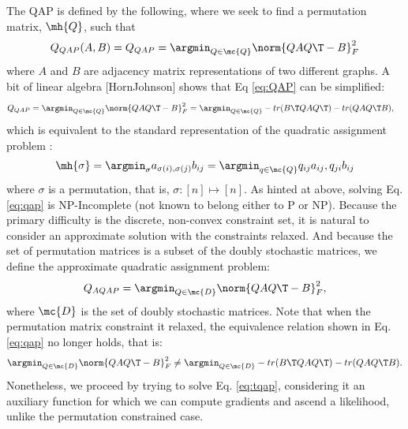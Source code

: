 The QAP is defined by the following, where we seek to find a permutation matrix, $\mh{Q}$, such that
 \begin{align} \label{eq:QAP}
	Q_{QAP}(A,B)=Q_{QAP} = \argmin_{Q \in \mc{Q}} \norm{Q A Q\T - B}^2_F
\end{align}
where $A$ and $B$ are adjacency matrix representations of two different graphs.  A bit of linear algebra [HornJohnson] shows that Eq \eqref{eq:QAP} can be simplified:
\begin{align} \label{eq:qap}
	Q_{QAP} &= \argmin_{Q \in \mc{Q}} \norm{Q A Q\T - B}^2_F = \argmin_{Q \in \mc{Q}} - tr(B\T QAQ\T) - tr(QAQ\T B),			
\end{align}
which is equivalent to the standard representation of the quadratic assignment problem \cite{}:
\begin{align}
	\mh{\sigma}= \argmin_{\sigma} a_{\sigma(i), \sigma(j)} b_{ij} = \argmin_{q \in \mc{Q}} q_{ij} a_{ij}, q_{ji} b_{ij}
\end{align}
where $\sigma$ is a permutation, that is, $\sigma: [n] \mapsto [n]$.  As hinted at above, solving Eq. \eqref{eq:qap} is NP-Incomplete (not known to belong either to P or NP).  Because the primary difficulty is the discrete, non-convex constraint set, it is natural to consider an approximate solution with the constraints relaxed.  And because the set of permutation matrices is a subset of the doubly stochastic matrices, we define the approximate quadratic assignment problem:
\begin{align} \label{eq:tqap}
	Q_{AQAP} = \argmin_{Q \in \mc{D}} \norm{Q A Q\T - B}^2_F,
\end{align}
where $\mc{D}$ is the set of doubly stochastic matrices.  Note that when the permutation matrix constraint it relaxed, the equivalence relation shown in Eq. \eqref{eq:qap} no longer holds, that is:
\begin{align} \label{eq:nqap}
	\argmin_{Q \in \mc{D}} \norm{Q A Q\T - B}^2_F \neq \argmin_{Q \in \mc{D}} - tr(B\T QAQ\T) - tr(QAQ\T B).
\end{align}
Nonetheless, we proceed by trying to solve Eq. \eqref{eq:tqap}, considering it an auxiliary function for which we can compute gradients and ascend a likelihood, unlike the permutation constrained case.  

